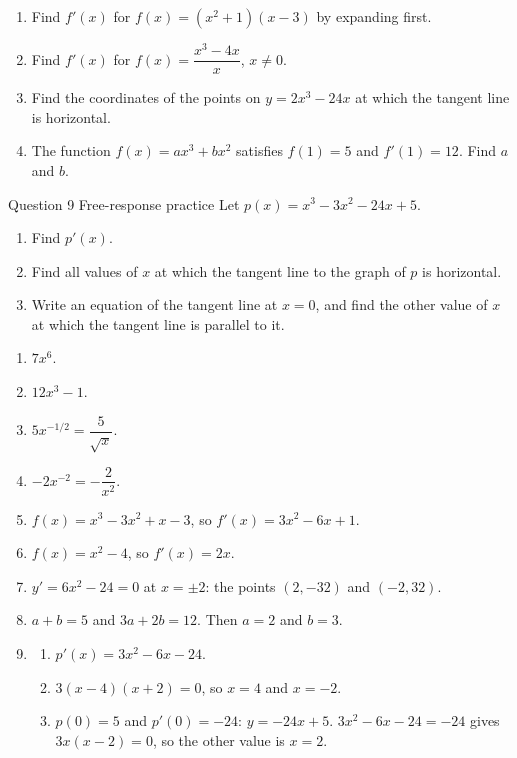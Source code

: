 \documentclass[11pt]{article}
\begin{document}
\begin{enumerate}[leftmargin=*,itemsep=2pt,start=5]
  \item Find $f'(x)$ for $f(x)=\left(x^2+1\right)(x-3)$ by expanding first.\work{2.8cm}
  \item Find $f'(x)$ for $f(x)=\dfrac{x^3-4x}{x}$, $x\neq0$.\work{2.8cm}
  \item Find the coordinates of the points on $y=2x^3-24x$ at which the tangent line is horizontal.\work{2.8cm}
  \item The function $f(x)=ax^3+bx^2$ satisfies $f(1)=5$ and $f'(1)=12$. Find $a$ and $b$.\work{2.8cm}
\end{enumerate}

\begin{frbox}{Question 9 \textperiodcentered{} Free-response practice}
Let $p(x)=x^3-3x^2-24x+5$.
\begin{enumerate}[label=(\alph*),leftmargin=*,itemsep=2pt]
  \item Find $p'(x)$.\work{2.6cm}
  \item Find all values of $x$ at which the tangent line to the graph of $p$ is horizontal.\work{2.6cm}
  \item Write an equation of the tangent line at $x=0$, and find the other value of $x$ at which the tangent line is parallel to it.\work{2.6cm}
\end{enumerate}
\end{frbox}

\newpage
\begin{solbox}
\begin{enumerate}[leftmargin=*,itemsep=4pt]
  \item $7x^6$.
  \item $12x^3-1$.
  \item $5x^{-1/2}=\dfrac{5}{\sqrt x}$.
  \item $-2x^{-2}=-\dfrac{2}{x^2}$.
  \item $f(x)=x^3-3x^2+x-3$, so $f'(x)=3x^2-6x+1$.
  \item $f(x)=x^2-4$, so $f'(x)=2x$.
  \item $y'=6x^2-24=0$ at $x=\pm2$: the points $(2,-32)$ and $(-2,32)$.
  \item $a+b=5$ and $3a+2b=12$. Then $a=2$ and $b=3$.
  \item \begin{enumerate}[label=(\alph*),leftmargin=*,itemsep=3pt]
    \item $p'(x)=3x^2-6x-24$.
    \item $3(x-4)(x+2)=0$, so $x=4$ and $x=-2$.
    \item $p(0)=5$ and $p'(0)=-24$: $y=-24x+5$. $3x^2-6x-24=-24$ gives $3x(x-2)=0$, so the other value is $x=2$.
  \end{enumerate}
\end{enumerate}
\end{solbox}
\end{document}
